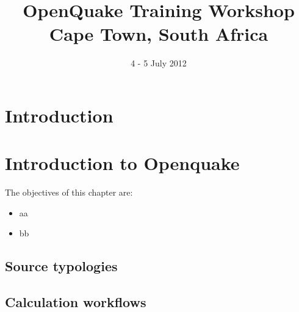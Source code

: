 \documentclass[11pt,a4paper,headings=small,dvips]{scrbook}
\newenvironment{myfancybox}{%
  \def\FrameCommand{\fboxsep=\FrameSep \fcolorbox{blue01}{honeydew}}%
  \color{black}\MakeFramed {\FrameRestore}}%
 {\endMakeFramed}
\begin{document}
\setcounter{page}{1}

\begin{titlepage}
	\title{ \textcolor{blue01}{\textsf{\bfseries\Huge 
        OpenQuake Training Workshop\\
        Cape Town, South Africa}}}
	\date{4 - 5 July 2012}
	\publishers{GEM Foundation, Pavia}
\end{titlepage}

\pagestyle{scrheadings}
\maketitle
\renewcommand*\thesection{\arabic{section}}
\renewcommand*\thefigure{\thesection.\arabic{figure}}
\clearpage
\chapter*{Introduction}
\cleardoublepage
\tableofcontents
\cleardoublepage
\chapter{Introduction to Openquake}
\begin{myfancybox}
The objectives of this chapter are:
\begin{itemize}
    \item aa
    \item bb
\end{itemize}
\end{myfancybox}
\section{Source typologies}
\section{Calculation workflows}
\cleardoublepage
\end{document}
